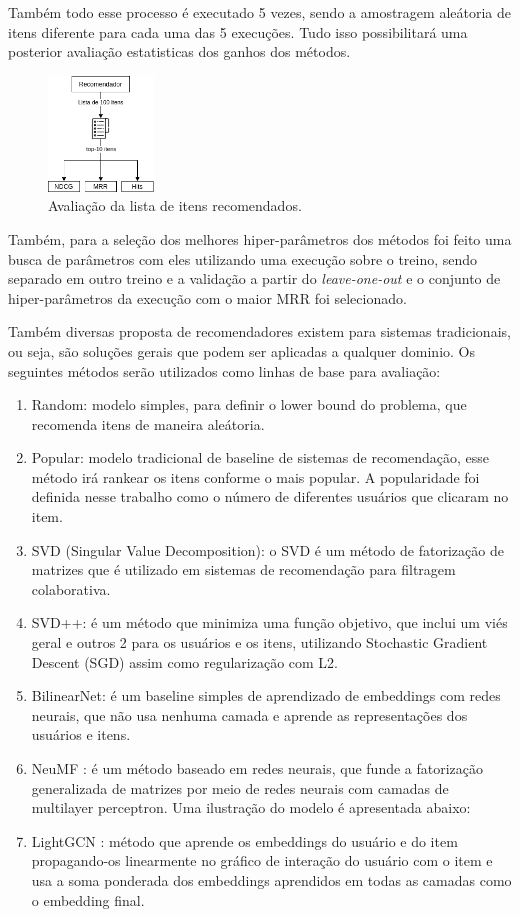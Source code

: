 \documentclass[sigconf]{acmart}
\begin{document}
Também todo esse processo é executado 5 vezes, sendo a amostragem aleátoria de itens diferente para cada uma das 5 execuções. Tudo isso possibilitará uma posterior avaliação estatisticas dos ganhos dos métodos.

\begin{figure}[h]
    \centering
    \includegraphics[width=0.25\textwidth]{./imgs/top100-to-top10.png}
    \caption{Avaliação da lista de itens recomendados.}
    \label{fig:aval}
\end{figure}

Também, para a seleção dos melhores hiper-parâmetros dos métodos foi feito uma busca de parâmetros com eles utilizando uma execução sobre o treino, sendo separado em outro treino e a validação a partir do \textit{leave-one-out} e o conjunto de hiper-parâmetros da execução com o maior MRR foi selecionado.

Também diversas proposta de recomendadores existem para sistemas tradicionais, ou seja, são soluções gerais que podem ser aplicadas a qualquer dominio. Os seguintes métodos serão utilizados como linhas de base para avaliação:

\begin{enumerate}
  \item Random: modelo simples, para definir o lower bound do problema, que recomenda itens de maneira aleátoria.
  \item Popular: modelo tradicional de baseline de sistemas de recomendação, esse método irá rankear os itens conforme o mais popular. A popularidade foi definida nesse trabalho como o número de diferentes usuários que clicaram no item.
  \item SVD (Singular Value Decomposition): o SVD é um método de fatorização de matrizes que é utilizado em sistemas de recomendação para filtragem colaborativa. 
  \item SVD++: é um método que minimiza uma função objetivo, que inclui um viés geral e outros 2 para os usuários e os itens, utilizando Stochastic Gradient Descent (SGD) assim como regularização com L2.
  \item BilinearNet: é um baseline simples de aprendizado de embeddings com redes neurais, que não usa nenhuma camada e aprende as representações dos usuários e itens.
  \item NeuMF \cite{he2017neural}: é um método baseado em redes neurais, que funde a fatorização generalizada de matrizes por meio de redes neurais com camadas de multilayer perceptron. Uma ilustração do modelo é apresentada abaixo:
  \item LightGCN \cite{he2020lightgcn}: método que aprende os embeddings do usuário e do item propagando-os linearmente no gráfico de interação do usuário com o item e usa a soma ponderada dos embeddings aprendidos em todas as camadas como o embedding final.
\end{enumerate}
\end{document}
